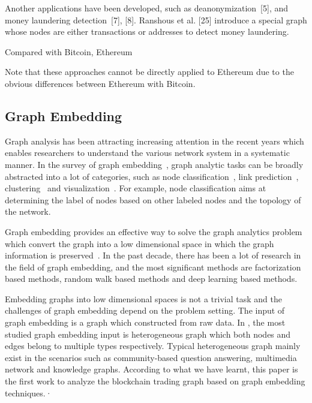 Another applications have been developed, such as deanonymization~[5], and money laundering detection~[7], [8]. Ranshous et al. [25] introduce a special graph whose nodes are either transactions or addresses to detect money laundering. 

Compared with Bitcoin, Ethereum  

Note that these approaches cannot be directly applied to Ethereum due to the obvious differences between Ethereum with Bitcoin.

\subsection{Graph Embedding}
Graph analysis has been attracting increasing attention in the recent years which enables researchers to understand the various network system in a systematic manner. In the survey of graph embedding~\cite{cai2018comprehensive}, graph analytic tasks can be broadly abstracted into a lot of categories, such as node classification~\cite{bhagat2011node}, link prediction~\cite{liben2007link}, clustering~\cite{ding2001min} and visualization~\cite{maaten2008visualizing}. For example, node classification aims at determining the label of nodes based on other labeled nodes and the topology of the network.

Graph embedding provides an effective way to solve the graph analytics problem which convert the graph into a low dimensional space in which the graph information is preserved~\cite{hamilton2017representation}. In the past decade, there has been a lot of research in the field of graph embedding, and the most significant methods are factorization based methods\cite{ahmed2013distributed,belkin2002laplacian,roweis2000nonlinear}, random walk based methods\cite{perozzi2014deepwalk,grover2016node2vec} and deep learning based methods\cite{wang2016structural,kipf2016semi}. 

Embedding graphs into low dimensional spaces is not a trivial task and the challenges of graph embedding depend on the problem setting. The input of graph embedding is a graph which constructed from raw data. In \cite{goyal2018graph}, the most studied graph embedding input is heterogeneous graph which both nodes and edges belong to multiple types respectively. Typical heterogeneous graph mainly exist in the scenarios such as community-based question answering, multimedia network and knowledge graphs. According to what we have learnt, this paper is the first work to analyze the blockchain trading graph based on graph embedding techniques.·